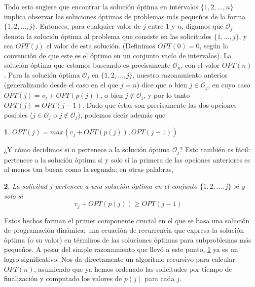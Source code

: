 \documentclass[a4paper, 12pt]{book}
\theoremstyle{dotless}
\newtheorem{theorem}{}[section]
\begin{document}
Todo esto sugiere que encontrar la solución óptima en intervalos $\{1,2,\dots,n\}$ implica observar las soluciones óptimas de problemas más pequeños de la forma $\{1,2,\dots,j\}$. Entonces, para cualquier valor de $j$ entre $1$ y $n$, digamos que $\mathcal{O}_j$ denota la solución óptima al problema que consiste en las solicitudes $\{1,\dots,j\}$, y sea $OPT(j)$ el valor de esta solución. (Definimos $OPT(0) = 0$, según la convención de que este es el óptimo en un conjunto vacío de intervalos). La solución óptima que estamos buscando es precisamente $\mathcal{O}_n$, con el valor $OPT(n)$. Para la solución óptima $\mathcal{O}_j$ en $\{1,2,\dots,j\}$, nuestro razonamiento anterior (generalizando desde el caso en el que $j = n$) dice que o bien $j \in \mathcal{O}_j$, en cuyo caso $OPT(j) = v_j + OPT(p(j))$, o bien $j \notin \mathcal{O}_j$, y por lo tanto $OPT(j) = OPT(j-1)$. Dado que éstas son precisamente las dos opciones posibles ($j\in \mathcal{O}_j$ o $j \notin \mathcal{O}_j$), podemos decir además que 

\vspace{8pt}
\noindent\colorbox{mygray}{\parbox{\textwidth}{
\begin{theorem}
$OPT(j) = max(v_j + OPT(p(j)), OPT(j − 1))$
\label{thm:6.1}
\end{theorem}
}}
\vspace{8pt}

¿Y cómo decidimos si $n$ pertenece a la solución óptima $\mathcal{O}_j$? Esto también es fácil: pertenece a la solución óptima si y solo si la primera de las opciones anteriores es al menos tan buena como la segunda; en otras palabras,

\vspace{8pt}
\noindent\colorbox{mygray}{\parbox{\textwidth}{
\begin{theorem}
La solicitud $j$ pertenece a una solución óptima en el conjunto $\{1,2,\dots,j\}$ si y solo si
$$v_j + OPT(p(j)) \geq OPT(j−1)$$
\vspace{-20pt}
\end{theorem}
}}
\vspace{8pt}

Estos hechos forman el primer componente crucial en el que se basa una solución de programación dinámica: una ecuación de recurrencia que expresa la solución óptima (o su valor) en términos de las soluciones óptimas para subproblemas más pequeños. A pesar del simple razonamiento que llevó a este punto, \ref{thm:6.1} ya es un logro significativo. Nos da directamente un algoritmo recursivo para calcular $OPT(n)$, asumiendo que ya hemos ordenado las solicitudes por tiempo de finalización y computado los valores de $p(j)$ para cada $j$.
\end{document}

